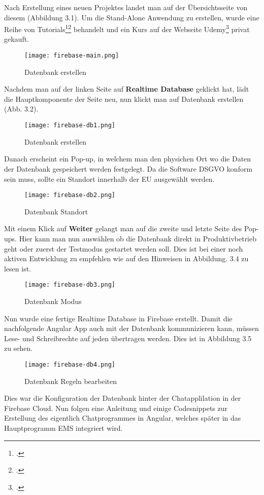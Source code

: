 Nach Erstellung eines neuen Projektes landet man auf der Übersichtsseite
von diesem (Abbildung 3.1). Um die Stand-Alone Anwendung zu erstellen, wurde eine Reihe von Tutorials\footcite{firebase-yt-tut}\footcite{firebase-tut1} behandelt und ein Kurs auf der Webseite Udemy\footcite{udemy-course} privat gekauft.
\begin{center}
    \begin{figure}[H]
        \centering
        \texttt{[image: firebase-main.png]}
        \caption{Datenbank erstellen}
    \end{figure}
\end{center}
Nachdem man auf der linken Seite auf \textbf{Realtime Database} geklickt hat, lädt die Hauptkomponente der Seite neu, nun klickt man auf Datenbank erstellen (Abb. 3.2).
\begin{center}
    \begin{figure}[H]
        \centering
        \texttt{[image: firebase-db1.png]}
        \caption{Datenbank erstellen}
    \end{figure}
\end{center}
Danach erscheint ein Pop-up, in welchem man den physichen Ort wo die Daten der Datenbank gespeichert werden festgelegt. Da die Software DSGVO konform sein muss, sollte ein Standort innerhalb der EU ausgewählt werden.
\begin{center}
    \begin{figure}[H]
        \centering
        \texttt{[image: firebase-db2.png]}
        \caption{Datenbank Standort}
    \end{figure}
\end{center}
Mit einem Klick auf \textbf{Weiter} gelangt man auf die zweite und letzte Seite des Pop-ups. Hier kann man nun auswählen ob die Datenbank direkt in Produktivbetrieb geht oder zuerst der Testmodus gestartet werden soll. Dies ist bei einer
noch aktiven Entwicklung zu empfehlen wie auf den Hinweisen in Abbildung. 3.4 zu lesen ist.
\begin{center}
    \begin{figure}[H]
        \centering
        \texttt{[image: firebase-db3.png]}
        \caption{Datenbank Modus}
    \end{figure}
\end{center}
Nun wurde eine fertige Realtime Database in Firebase erstellt. Damit die nachfolgende Angular App auch mit der Datenbank kommunizieren kann, müssen Lese- und Schreibrechte auf
jeden übertragen werden. Dies ist in Abbildung 3.5 zu sehen.
\begin{center}
    \begin{figure}[H]
        \centering
        \texttt{[image: firebase-db4.png]}
        \caption{Datenbank Regeln bearbeiten}
    \end{figure}
\end{center}
Dies war die Konfiguration der Datenbank hinter der Chatapplilation in der Firebase Cloud. Nun folgen eine Anleitung und einige Codesnippets zur Erstellung des eigentlich Chatprogrammes in Angular, welches später in das Hauptprogramm
EMS integriert wird.

